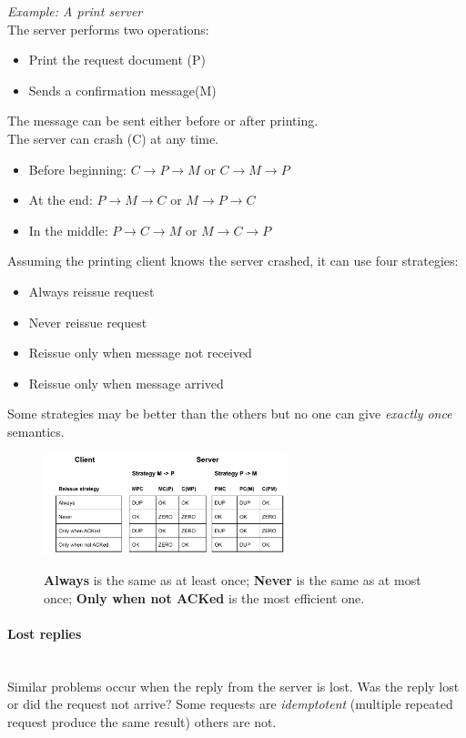 \documentclass[10pt,a4paper]{article}
\newcommand{\myparagraph}[1]{\paragraph{#1}\mbox{}\\[0.05in]}
\begin{document}
\textit{Example: A print server} \\
The server performs two operations:
\begin{itemize}
	\item Print the request document (P)
	\item Sends a confirmation message(M)
\end{itemize}
The message can be sent either before or after printing. \\ The server can crash (C) at any time.
\begin{itemize}
	\item Before beginning: $C \rightarrow P \rightarrow M$ or $C \rightarrow M \rightarrow P$
	\item At the end: $P \rightarrow M \rightarrow C$ or $M\rightarrow P \rightarrow C$ 
	\item In the middle: $P \rightarrow C \rightarrow M$ or $M \rightarrow C \rightarrow P$
\end{itemize}
Assuming the printing client knows the server crashed, it can use four strategies:
\begin{itemize}
	\item Always reissue request
	\item Never reissue request
	\item Reissue only when message not received
	\item Reissue only when message arrived
\end{itemize}
Some strategies may be better than the others but no one can give \textit{exactly once} semantics.
\begin{figure}[h!]
\hfill \includegraphics[width=200pt]{images/no-exactly.png}\hspace*{\fill}
  \label{fig:no-exactly}
  \caption{\textbf{Always} is the same as at least once; \textbf{Never} is the same as at most once; \textbf{Only when not ACKed} is the most efficient one.}
\end{figure}
\myparagraph{Lost replies}
Similar problems occur when the reply from the server is lost. Was the reply lost or did the request not arrive? Some requests are \textit{idemptotent} (multiple repeated request produce the same result) others are not. \\
\end{document}
